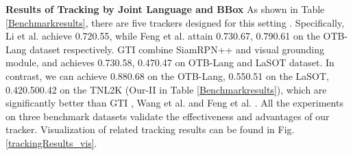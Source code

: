 \documentclass[final]{cvpr}
\begin{document}
\textbf{Results of Tracking by Joint Language and BBox}
As shown in Table \ref{Benchmarkresults}, there are five trackers designed for this setting \cite{li2017tracking, feng2020langTrackwacv, feng2019robust, yang2019grounding, wang2018describe}. Specifically, Li et al. \cite{li2017tracking} achieve 0.720.55, while Feng et al. \cite{feng2019robust, feng2020langTrackwacv} attain 0.730.67, 0.790.61 on the OTB-Lang dataset respectively. GTI \cite{yang2019grounding} combine SiamRPN++ and visual grounding module, and achieves 0.730.58, 0.470.47 on OTB-Lang and LaSOT dataset. In contrast, we can achieve 0.880.68 on the OTB-Lang, 0.550.51 on the LaSOT, 0.420.500.42 on the TNL2K (Our-II in Table \ref{Benchmarkresults}), which are significantly better than GTI \cite{yang2019grounding}, Wang et al. \cite{wang2018describe} and Feng et al. \cite{feng2020langTrackwacv}. All the experiments on three benchmark datasets validate the effectiveness and advantages of our tracker. Visualization of related tracking results can be found in Fig. \ref{trackingResults_vis}. 
\end{document}

